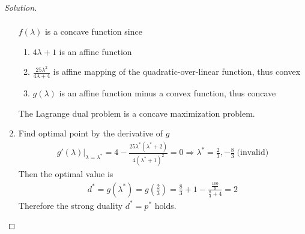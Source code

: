 \documentclass[12pt]{extarticle}
\theoremstyle{definition}
\begin{document}
\begin{proof}[Solution]
\begin{enumerate}[label=(\alph*)]
\begin{align*}
          \end{align*}
          $f(\lambda)$ is a concave function since
          \begin{enumerate}[label=(\roman*)]
            \item $4\lambda+1$ is an affine function
            \item $\frac{25\lambda^2}{4\lambda+4}$ is affine mapping of the quadratic-over-linear function, thus convex
            \item $g(\lambda)$ is an affine function minus a convex function, thus concave
          \end{enumerate}
          The Lagrange dual problem is a concave maximization problem.
    \item Find optimal point by the derivative of $g$
          \begin{align*}
            g'(\lambda)|_{\lambda=\lambda^\ast}=4-\frac{25\lambda^\ast(\lambda^\ast+2)}{4(\lambda^\ast+1)^2}=0\Rightarrow \lambda^\ast=\frac{2}{3},-\frac{8}{3}\;\text{(invalid)}
          \end{align*}
          Then the optimal value is
          \begin{align*}
            d^\ast=g(\lambda^\ast)=g(\frac{2}{3})=\frac{8}{3}+1-\frac{\frac{100}{9}}{\frac{8}{3}+4}=2
          \end{align*}
          Therefore the strong duality $d^\ast=p^\ast$ holds.
  \end{enumerate}
\end{proof}
\end{document}
